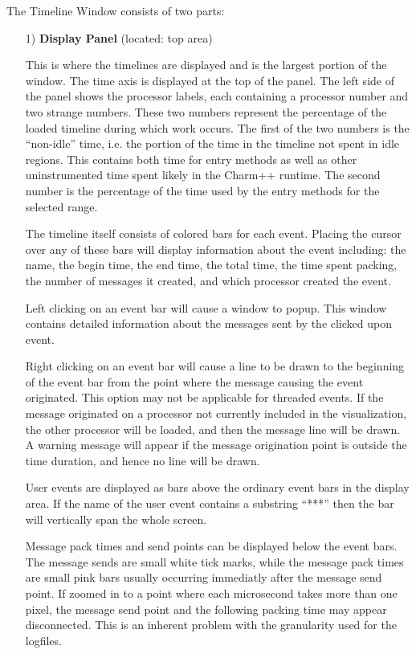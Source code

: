 \documentclass[10pt]{article}
\begin{document}
The Timeline Window consists of two parts:
\begin{enumerate}
\item[1)]
{\bf Display Panel} (located: top area)

This is where the timelines are displayed and is the largest portion
of the window.  The time axis is displayed at the top 
of the panel.  The left side of the
panel shows the processor labels, each containing a processor number and
two strange numbers. These two numbers represent the percentage of the
loaded timeline during which work occurs. The first of the two numbers
is the ``non-idle'' time, i.e. the portion of the time in the timeline
not spent in idle regions. This contains both time for entry methods
as well as other uninstrumented time spent likely in the Charm++
runtime. The second number is the percentage of the time used by the
entry methods for the selected range.


The timeline itself consists of colored bars for each event.
Placing the cursor over any of these bars will display information 
about the event including:  the name, the begin time, the end
time, the total time, the time spent packing, the number of messages it
created, and which processor created the event. 

Left clicking on an event bar will cause a window to popup. This
window contains detailed information about the messages sent by the
clicked upon event.

Right clicking on an event bar will cause a line to be drawn to the
beginning of the event bar from the point where the message causing
the event originated. This option may not be applicable for threaded
events. If the message originated on a processor not currently
included in the visualization, the other processor will be loaded, and
then the message line will be drawn. A warning message will appear if
the message origination point is outside the time duration, and hence
no line will be drawn.

User events are displayed as bars above the ordinary
event bars in the display area. If the name of the user event contains a substring ``***'' then the bar will vertically span the whole screen.

Message pack times and send points can be displayed below the event
bars. The message sends are small white tick marks, while the message
pack times are small pink bars usually occurring immediatly after the
message send point. If zoomed in to a point where each microsecond
takes more than one pixel, the message send point and the following
packing time may appear disconnected. This is an inherent problem with
the granularity used for the logfiles.



\end{enumerate}
\end{document}
